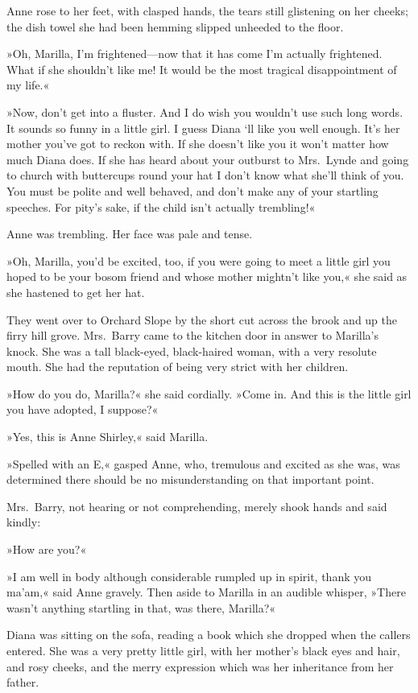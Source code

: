 Anne rose to her feet, with clasped hands, the tears still glistening on her cheeks; the dish towel she had been hemming slipped unheeded to the floor.

»Oh, Marilla, I'm frightened—now that it has come I'm actually frightened. What if she shouldn't like me! It would be the most tragical disappointment of my life.«

»Now, don't get into a fluster. And I do wish you wouldn't use such long words. It sounds so funny in a little girl. I guess Diana `ll like you well enough. It's her mother you've got to reckon with. If she doesn't like you it won't matter how much Diana does. If she has heard about your outburst to Mrs.~Lynde and going to church with buttercups round your hat I don't know what she'll think of you. You must be polite and well behaved, and don't make any of your startling speeches. For pity's sake, if the child isn't actually trembling!«

Anne was trembling. Her face was pale and tense.

»Oh, Marilla, you'd be excited, too, if you were going to meet a little girl you hoped to be your bosom friend and whose mother mightn't like you,« she said as she hastened to get her hat.

They went over to Orchard Slope by the short cut across the brook and up the firry hill grove. Mrs.~Barry came to the kitchen door in answer to Marilla's knock. She was a tall black-eyed, black-haired woman, with a very resolute mouth. She had the reputation of being very strict with her children.

»How do you do, Marilla?« she said cordially. »Come in. And this is the little girl you have adopted, I suppose?«

»Yes, this is Anne Shirley,« said Marilla.

»Spelled with an E,« gasped Anne, who, tremulous and excited as she was, was determined there should be no misunderstanding on that important point.

Mrs.~Barry, not hearing or not comprehending, merely shook hands and said kindly:

»How are you?«

»I am well in body although considerable rumpled up in spirit, thank you ma'am,« said Anne gravely. Then aside to Marilla in an audible whisper, »There wasn't anything startling in that, was there, Marilla?«

Diana was sitting on the sofa, reading a book which she dropped when the callers entered. She was a very pretty little girl, with her mother's black eyes and hair, and rosy cheeks, and the merry expression which was her inheritance from her father.

